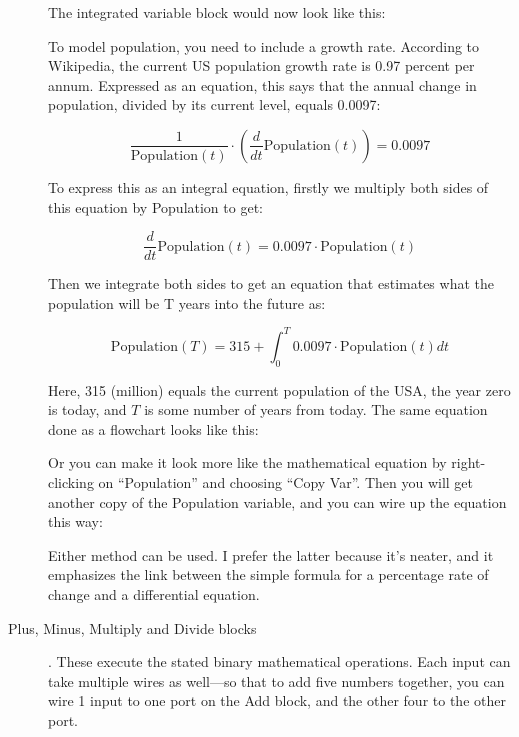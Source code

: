 \begin{description}
The integrated variable block would now look like this:



To model population, you need to include a growth rate. According to
Wikipedia, the current US population growth rate is 0.97 percent per
annum.  Expressed as an equation, this says that the annual change in
population, divided by its current level, equals 0.0097: 

\begin{displaymath}
\frac{1}{\mathrm{Population}(t)}\cdot\left(\frac{d}{dt}\mathrm{Population}(t)\right)=0.0097
\end{displaymath}

To express this as an integral equation, firstly we multiply both
sides of this equation by Population to get:

\begin{displaymath}
\frac{d}{dt}\mathrm{Population}(t)=0.0097\cdot\mathrm{Population}(t)
\end{displaymath}

Then we integrate both sides to get an equation that estimates what
the population will be T years into the future as:

\begin{displaymath}
\mathrm{Population}(T)=315+\int_0^T 0.0097\cdot\mathrm{Population}(t)
dt
\end{displaymath}

Here, 315 (million) equals the current population of the USA, the year
zero is today, and $T$ is some number of years from today. The same
equation done as a flowchart looks like this: 



Or you can make it look more like the mathematical equation by
right-clicking on ``Population'' and choosing ``Copy Var''. Then you will
get another copy of the Population variable, and you can wire up the
equation this way:


Either method can be used. I prefer the latter because it's neater,
and it emphasizes the link between the simple formula for a percentage
rate of change and a differential equation. 

\item[Plus, Minus, Multiply and Divide blocks]
    . These execute the stated binary
    mathematical operations. Each input can take multiple wires as
    well---so that to add five numbers together, you can wire 1 input
    to one port on the Add block, and the other four to the other
    port. 



\end{description}
